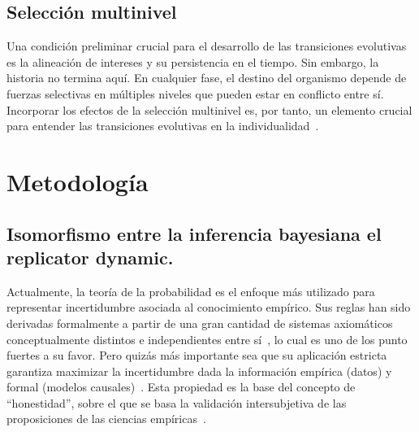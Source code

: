 \documentclass[a4paper,10pt]{article}
\begin{document}
\subsection{Selección multinivel}

Una condición preliminar crucial para el desarrollo de las transiciones evolutivas es la alineación de intereses y su persistencia en el tiempo.
Sin embargo, la historia no termina aquí.
En cualquier fase, el destino del organismo depende de fuerzas selectivas en múltiples niveles que pueden estar en conflicto entre sí.
Incorporar los efectos de la selección multinivel es, por tanto, un elemento crucial para entender las transiciones evolutivas en la individualidad~\cite{okasha2005-multilevelTransitions}.



\section{Metodología}


\subsection{Isomorfismo entre la inferencia bayesiana el replicator dynamic.}

Actualmente, la teoría de la probabilidad es el enfoque más utilizado para representar incertidumbre asociada al conocimiento empírico.
Sus reglas han sido derivadas formalmente a partir de una gran cantidad de sistemas axiomáticos conceptualmente distintos e independientes entre sí~\cite{halpern2017-RAU2}, lo cual es uno de los punto fuertes a su favor.
Pero quizás más importante sea que su aplicación estricta garantiza maximizar la incertidumbre dada la información empírica (datos) y formal (modelos causales)~\cite{jaynes2003}.
Esta propiedad es la base del concepto de ``honestidad'', sobre el que se basa la validación intersubjetiva de las proposiciones de las ciencias empíricas~\cite{landfried2021-conocimientoEmpirico}.
\end{document}
